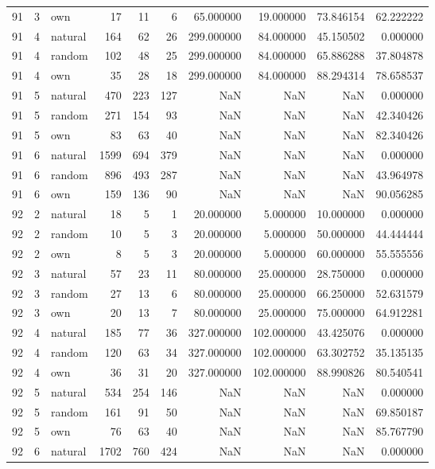 \begin{table}[htbp]
\begin{tabular}{rrlrrrrrrr}
91 & 3 & own & 17 & 11 & 6 & 65.000000 & 19.000000 & 73.846154 & 62.222222 \\
91 & 4 & natural & 164 & 62 & 26 & 299.000000 & 84.000000 & 45.150502 & 0.000000 \\
91 & 4 & random & 102 & 48 & 25 & 299.000000 & 84.000000 & 65.886288 & 37.804878 \\
91 & 4 & own & 35 & 28 & 18 & 299.000000 & 84.000000 & 88.294314 & 78.658537 \\
91 & 5 & natural & 470 & 223 & 127 & NaN & NaN & NaN & 0.000000 \\
91 & 5 & random & 271 & 154 & 93 & NaN & NaN & NaN & 42.340426 \\
91 & 5 & own & 83 & 63 & 40 & NaN & NaN & NaN & 82.340426 \\
91 & 6 & natural & 1599 & 694 & 379 & NaN & NaN & NaN & 0.000000 \\
91 & 6 & random & 896 & 493 & 287 & NaN & NaN & NaN & 43.964978 \\
91 & 6 & own & 159 & 136 & 90 & NaN & NaN & NaN & 90.056285 \\
92 & 2 & natural & 18 & 5 & 1 & 20.000000 & 5.000000 & 10.000000 & 0.000000 \\
92 & 2 & random & 10 & 5 & 3 & 20.000000 & 5.000000 & 50.000000 & 44.444444 \\
92 & 2 & own & 8 & 5 & 3 & 20.000000 & 5.000000 & 60.000000 & 55.555556 \\
92 & 3 & natural & 57 & 23 & 11 & 80.000000 & 25.000000 & 28.750000 & 0.000000 \\
92 & 3 & random & 27 & 13 & 6 & 80.000000 & 25.000000 & 66.250000 & 52.631579 \\
92 & 3 & own & 20 & 13 & 7 & 80.000000 & 25.000000 & 75.000000 & 64.912281 \\
92 & 4 & natural & 185 & 77 & 36 & 327.000000 & 102.000000 & 43.425076 & 0.000000 \\
92 & 4 & random & 120 & 63 & 34 & 327.000000 & 102.000000 & 63.302752 & 35.135135 \\
92 & 4 & own & 36 & 31 & 20 & 327.000000 & 102.000000 & 88.990826 & 80.540541 \\
92 & 5 & natural & 534 & 254 & 146 & NaN & NaN & NaN & 0.000000 \\
92 & 5 & random & 161 & 91 & 50 & NaN & NaN & NaN & 69.850187 \\
92 & 5 & own & 76 & 63 & 40 & NaN & NaN & NaN & 85.767790 \\
92 & 6 & natural & 1702 & 760 & 424 & NaN & NaN & NaN & 0.000000 \\

\end{tabular}
\end{table}
